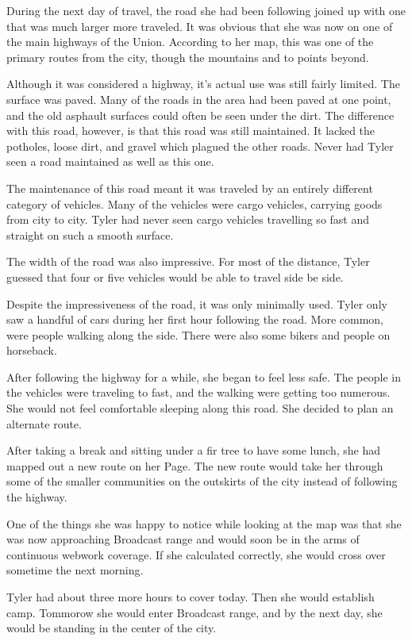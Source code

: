 \documentclass[courier]{sffms}
\begin{document}
During the next day of travel, the road she had been
following joined up with one that was much larger
more traveled. It was obvious that she was now on
one of the main highways of the Union. According to
her map, this was one of the primary routes from the
city, though the mountains and to points beyond.

Although it was considered a highway, it's actual use
was still fairly limited. The surface was paved. Many
of the roads in the area had been paved at one point,
and the old asphault surfaces could often be seen
under the dirt. The difference with this road, however,
is that this road was still maintained. It lacked the
potholes, loose dirt, and gravel which plagued the other
roads. Never had Tyler seen a road maintained as well
as this one.

The maintenance of this road meant it was traveled by
an entirely different category of vehicles. Many of the
vehicles were cargo vehicles, carrying goods from city
to city. Tyler had never seen cargo vehicles travelling so
fast and straight on such a smooth surface. 

The width of the road was also impressive. For most
of the distance, Tyler guessed that four or five vehicles
would be able to travel side be side.

Despite the impressiveness of the road, it was only
minimally used. Tyler only saw a handful of cars during
her first hour following the road. More common, were 
people walking along the side. There were also some
bikers and people on horseback.

After following the highway for a while, she began to
feel less safe. The people in the vehicles were traveling
to fast, and the walking were getting too numerous.
She would not feel comfortable sleeping along this road.
She decided to plan an alternate route.

After taking a break and sitting under a fir tree to have
some lunch, she had mapped out a new route on her
Page. The new route would take her through some of
the smaller communities on the outskirts of the city
instead of following the highway.

One of the things she was happy to notice while looking
at the map was that she was now approaching
Broadcast range and would soon be in the arms of
continuous webwork coverage. If she calculated correctly,
she would cross over sometime the next morning.

Tyler had about three more hours to cover today. Then
she would establish camp. Tommorow she would enter
Broadcast range, and by the next day, she would be
standing in the center of the city.
\end{document}
